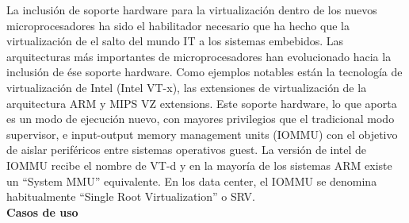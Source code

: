 La inclusión de soporte hardware para la virtualización dentro de los nuevos microprocesadores ha sido
el habilitador necesario que ha hecho que la virtualización de el salto del mundo IT a los sistemas embebidos. Las
arquitecturas más importantes de microprocesadores han evolucionado hacia la inclusión de ése soporte hardware.
Como ejemplos notables están la tecnología de virtualización de Intel  (Intel VT-x), las extensiones de virtualización de la arquitectura ARM y MIPS VZ extensions.
Este soporte hardware, lo que aporta es un modo de ejecución nuevo, con mayores privilegios que el tradicional modo
supervisor, e input-output memory management units (\acrshort{IOMMU}) con el objetivo de aislar periféricos entre sistemas operativos guest. La versión de intel de \acrshort{IOMMU} recibe el
nombre de VT-d y en la mayoría de los sistemas ARM existe un ``System \acrshort{MMU}'' equivalente. En los data center, el \acrshort{IOMMU} se denomina habitualmente ``Single Root Virtualization'' o SRV.\\[1cm]
\textbf{Casos de uso}
